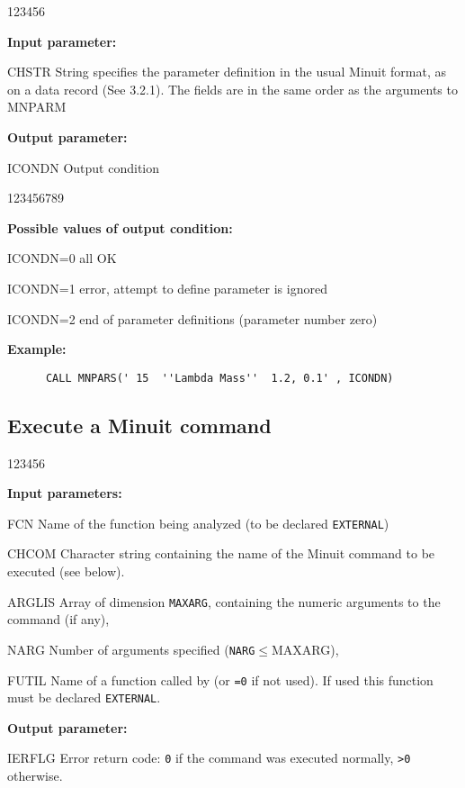 \begin{DLtt}{123456}
\item[{\rm\bf Input parameter:}]
\item[CHSTR] String specifies the parameter definition in the usual Minuit
  format, as on a data record (See 3.2.1). The fields are in the same order
  as the arguments to MNPARM
\item[{\rm\bf Output parameter:}]
\item[ICONDN] Output condition
\end{DLtt}
\begin{DLtt}{123456789}
\item[{\rm\bf Possible values of output condition:}]
\item[ICONDN=0]    all OK
\item[ICONDN=1]    error, attempt to define parameter is ignored
\item[ICONDN=2]    end of parameter definitions (parameter number zero)
\end{DLtt}

{\rm\bf Example:}
\begin{verbatim}
      CALL MNPARS(' 15  ''Lambda Mass''  1.2, 0.1' , ICONDN)
\end{verbatim}


\subsection{Execute a Minuit command}
 
 
\begin{DLtt}{123456}
\item[{\rm\bf Input parameters:}]
\item[FCN]    Name of the function being analyzed (to be declared \texttt{EXTERNAL})
\item[CHCOM]  Character string containing the name of the Minuit
              command to be executed (see below).
\item[ARGLIS] Array of dimension \texttt{MAXARG}, containing the numeric arguments 
              to the command (if any),
\item[NARG]   Number of arguments specified (\texttt{NARG}$\leq${MAXARG}),
\item[FUTIL]  Name of a function called by  (or \texttt{=0} if not used).
              If used this function must be declared \texttt{EXTERNAL}.
\item[{\rm\bf Output parameter:}]
\item[IERFLG] Error return code: \texttt{0} if the command was executed normally, 
              \texttt{>0} otherwise.
\end{DLtt}
 
